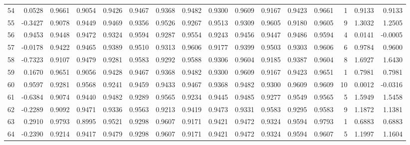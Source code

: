 \begin{tabular}{lrrrrrrrrrrrrrrr}
54  &      0.0528 &  0.9661 &  0.9054 &  0.9426 &  0.9467 &  0.9368 &  0.9482 &  0.9300 &  0.9609 &  0.9167 &   0.9423 &     0.9661 &      1 &                    0.9133 &                     0.9133 \\
55  &     -0.3427 &  0.9078 &  0.9449 &  0.9469 &  0.9356 &  0.9526 &  0.9267 &  0.9513 &  0.9309 &  0.9605 &   0.9180 &     0.9605 &      9 &                    1.3032 &                     1.2505 \\
56  &      0.9453 &  0.9448 &  0.9472 &  0.9324 &  0.9594 &  0.9287 &  0.9554 &  0.9243 &  0.9456 &  0.9447 &   0.9486 &     0.9594 &      4 &                    0.0141 &                    -0.0005 \\
57  &     -0.0178 &  0.9422 &  0.9465 &  0.9389 &  0.9510 &  0.9313 &  0.9606 &  0.9177 &  0.9399 &  0.9503 &   0.9303 &     0.9606 &      6 &                    0.9784 &                     0.9600 \\
58  &     -0.7323 &  0.9107 &  0.9479 &  0.9281 &  0.9583 &  0.9292 &  0.9588 &  0.9306 &  0.9604 &  0.9185 &   0.9387 &     0.9604 &      8 &                    1.6927 &                     1.6430 \\
59  &      0.1670 &  0.9651 &  0.9056 &  0.9428 &  0.9467 &  0.9368 &  0.9482 &  0.9300 &  0.9609 &  0.9167 &   0.9423 &     0.9651 &      1 &                    0.7981 &                     0.7981 \\
60  &      0.9597 &  0.9281 &  0.9568 &  0.9241 &  0.9459 &  0.9433 &  0.9467 &  0.9368 &  0.9482 &  0.9300 &   0.9609 &     0.9609 &     10 &                    0.0012 &                    -0.0316 \\
61  &     -0.6384 &  0.9074 &  0.9440 &  0.9482 &  0.9289 &  0.9565 &  0.9234 &  0.9445 &  0.9485 &  0.9277 &   0.9549 &     0.9565 &      5 &                    1.5949 &                     1.5458 \\
62  &     -0.2289 &  0.9092 &  0.9471 &  0.9336 &  0.9563 &  0.9213 &  0.9419 &  0.9473 &  0.9331 &  0.9583 &   0.9295 &     0.9583 &      9 &                    1.1872 &                     1.1381 \\
63  &      0.2910 &  0.9793 &  0.8995 &  0.9521 &  0.9298 &  0.9607 &  0.9171 &  0.9421 &  0.9472 &  0.9324 &   0.9594 &     0.9793 &      1 &                    0.6883 &                     0.6883 \\
64  &     -0.2390 &  0.9214 &  0.9417 &  0.9479 &  0.9298 &  0.9607 &  0.9171 &  0.9421 &  0.9472 &  0.9324 &   0.9594 &     0.9607 &      5 &                    1.1997 &                     1.1604 \\

\end{tabular}
